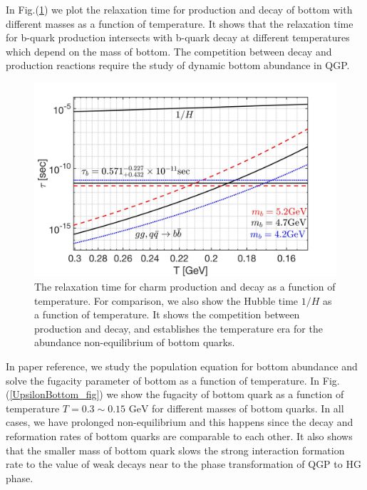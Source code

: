 \documentclass[universe,article,submit,moreauthors,pdftex,a4paper]{Definitions/mdpi}
\newcommand{\GeV}{\text{ GeV}}
\newcommand*{\xblue}{\color{blue}}
\begin{document}
In Fig.(\ref{Breaction_fig}) we plot the relaxation time for production and decay of bottom with different masses as a function of temperature. It shows that the relaxation time for b-quark production intersects with b-quark decay at different temperatures which depend on the mass of bottom. The competition between decay and production reactions require the study of dynamic bottom abundance in QGP.
\begin{figure} %
\centering
\includegraphics[width=\linewidth]{BQuarkReactionTime_bottom.jpg}
\caption{The relaxation time for charm production and decay as a function of temperature. For comparison, we also show the Hubble time $1/H$ as a function of temperature. It shows the competition between production and decay, and  establishes the temperature era for the abundance non-equilibrium of bottom quarks.}
\label{Breaction_fig}
\end{figure}

In paper {\xblue reference}, we study the population equation for bottom abundance and solve the fugacity parameter of bottom as a function of temperature. In Fig.(\ref{UpsilonBottom_fig}) we show the fugacity of bottom quark as a function of temperature $T=0.3\sim0.15\GeV$ for different masses of bottom quarks. In all cases, we have prolonged non-equilibrium and this happens since the decay and reformation rates of bottom quarks are comparable to each other. It also shows that  the smaller mass of bottom quark slows the strong interaction formation rate to the value of weak decays near to the phase transformation of QGP to HG phase.
\end{document}
